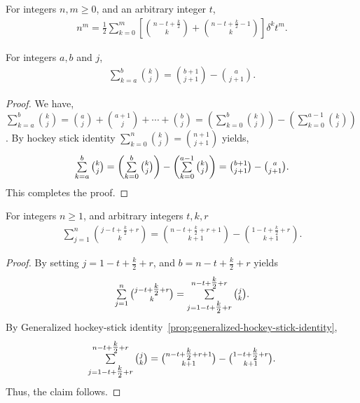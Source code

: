 \begin{lemma}
  \label{prop:halved-central-factorial-powers}
  For integers $n,m \geq 0$, and an arbitrary integer $t$,
  \begin{align*}
    n^m = \frac{1}{2} \sum_{k=0}^{m}
    \left[
      \binom{n-t+\frac{k}{2}}{k} + \binom{n-t+\frac{k}{2}-1}{k}
    \right] \delta^{k} t^m.
  \end{align*}
\end{lemma}

\begin{lemma}
  \label{prop:generalized-hockey-stick-identity}
  For integers $a,b$ and $j$,
  \begin{align*}
    \sum_{k=a}^{b} \binom{k}{j} = \binom{b+1}{j+1} - \binom{a}{j+1}.
  \end{align*}
  \begin{proof}
    We have,
    $\sum_{k=a}^{b} \binom{k}{j}
    = \binom{a}{j} + \binom{a+1}{j} + \cdots + \binom{b}{j}
    = \left( \sum_{k=0}^{b} \binom{k}{j} \right) - \left( \sum_{k=0}^{a-1} \binom{k}{j} \right)$.
    By hockey stick identity $\sum_{k=0}^{n} \binom{k}{j} = \binom{n+1}{j+1}$ yields,
    \begin{align*}
      \mathop{\textstyle\sum}_{k=a}^{b} \tbinom{k}{j}
      = \left( \mathop{\textstyle\sum}_{k=0}^{b} \tbinom{k}{j} \right) - \left( \mathop{\textstyle\sum}_{k=0}^{a-1} \tbinom{k}{j} \right)
      = \tbinom{b+1}{j+1} - \tbinom{a}{j+1}.
    \end{align*}
    This completes the proof.
  \end{proof}
\end{lemma}

\begin{lemma}
  \label{lem:centered-hockey-stick-identity}
  For integers $n\geq1$, and arbitrary integers $t,k,r$
  \begin{align*}
    \sum_{j=1}^{n} \binom{j -t + \frac{k}{2} +r}{k}
    = \binom{n -t + \frac{k}{2} + r +1}{k+1} - \binom{1 -t + \tfrac{k}{2} +r}{k+1}.
  \end{align*}
  \begin{proof}
    By setting $j=1 -t + \tfrac{k}{2} +r$, and $b=n-t+ \tfrac{k}{2} +r$ yields
    \begin{align*}
      \mathop{\textstyle\sum}_{j=1}^{n} \tbinom{j -t + \tfrac{k}{2} +r}{k} =
      \mathop{\textstyle\sum}_{j=1 -t + \tfrac{k}{2} +r}^{n -t + \tfrac{k}{2} +r} \tbinom{j}{k}.
    \end{align*}
    By Generalized hockey-stick identity~\eqref{prop:generalized-hockey-stick-identity},
    \begin{align*}
      \mathop{\textstyle\sum}_{j=1 -t + \tfrac{k}{2} +r}^{n -t + \tfrac{k}{2} +r} \tbinom{j}{k}
      = \tbinom{n -t + \tfrac{k}{2} + r +1}{k+1} - \tbinom{1 -t + \tfrac{k}{2} +r}{k+1}.
    \end{align*}
    Thus, the claim follows.
  \end{proof}
\end{lemma}
